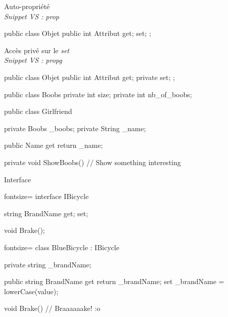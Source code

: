 \begin{frame}[fragile]
    \begin{center}
        {\large Auto-propriété}\\
        \emph{\scriptsize Snippet VS : prop}
    \end{center}
    \begin{csharpcode}
public class Objet
{
    public int Attribut { get; set; };
}
    \end{csharpcode}
    \pause
    \begin{center}
        {\large Accès privé sur le \emph{set}}\\
        \emph{\scriptsize Snippet VS : propg}
    \end{center}
    \begin{csharpcode}
public class Objet
{
    public int Attribut { get; private set; };
}
    \end{csharpcode}
\end{frame}

\begin{frame}[fragile]
  \begin{csharpcode}
public class Boobs
{
    private int size;
    private int nb_of_boobs;
}
  \end{csharpcode}
  \pause
  \begin{csharpcode}
public class Girlfriend
{
    private Boobs _boobs;
    private String _name;

    public Name {
      get { return _name; }
    }

    private void ShowBoobs()
    {
        // Show something interesting
    }
}
  \end{csharpcode}
\end{frame}

\begin{frame}[fragile]
    \begin{center}{\large Interface}\end{center}
    \begin{csharpcode*}{fontsize=\scriptsize}
interface IBicycle
{
     string BrandName { get; set; }

     void Brake();
}
    \end{csharpcode*}
    \pause
    \begin{csharpcode*}{fontsize=\scriptsize}
class BlueBicycle : IBicycle
{
    private string _brandName;

    public string BrandName {
        get { return _brandName; }
        set { _brandName = lowerCase(value); }
    }

    void Brake() {
        // Braaaaaake! :o
    }
}
    \end{csharpcode*}
\end{frame}

